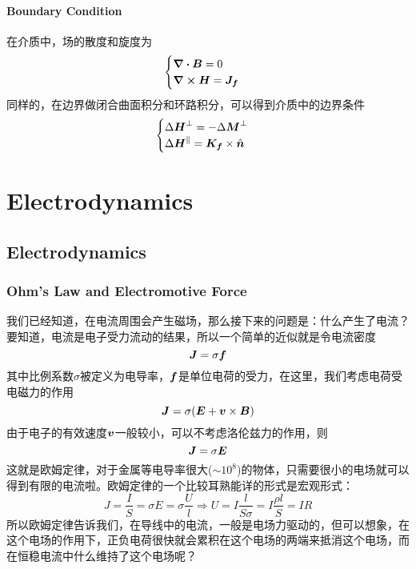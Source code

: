 \documentclass[14pt,oneside]{book}
\begin{document}
\begin{large}
\subsection{Boundary Condition}
在介质中，场的散度和旋度为
\begin{align}
	\begin{cases}
		\div{\vb*{B}}=0\\
		\curl{\vb*{H}}=\vb*{J_f}
	\end{cases}
\end{align}
同样的，在边界做闭合曲面积分和环路积分，可以得到介质中的边界条件
\begin{align}
	\begin{cases}
		\Delta \vb*{H}^\perp =-\Delta \vb*{M}^\perp\\
		\Delta \vb*{H}^\parallel =\vb*{K_f}\times \hat{\vb*{n}}
	\end{cases}
\end{align}

\part{Electrodynamics}
\chapter{Electrodynamics}
\section{Ohm's Law and Electromotive Force}
我们已经知道，在电流周围会产生磁场，那么接下来的问题是：什么产生了电流？要知道，电流是电子受力流动的结果，所以一个简单的近似就是令电流密度
\begin{equation}
  \vb*{J}=\sigma \vb*{f}
\end{equation}
其中比例系数$\sigma$被定义为电导率，$\vb*{f}$是单位电荷的受力，在这里，我们考虑电荷受电磁力的作用
\begin{equation}
  \vb*{J}=\sigma(\vb*{E}+\vb*{v}\times \vb*{B})
\end{equation}
由于电子的有效速度$\vb*{v}$一般较小，可以不考虑洛伦兹力的作用，则
\begin{equation}
  \vb*{J}=\sigma \vb*{E}
\end{equation}
这就是欧姆定律，对于金属等电导率很大($\sim 10^8$)的物体，只需要很小的电场就可以得到有限的电流啦。欧姆定律的一个比较耳熟能详的形式是宏观形式：
\begin{equation}
  J=\frac{I}{S}=\sigma E=\sigma \frac{U}{l}\Rightarrow U=I\frac{l}{S\sigma}=I\frac{\rho l}{S}=IR
\end{equation}
所以欧姆定律告诉我们，在导线中的电流，一般是电场力驱动的，但可以想象，在这个电场的作用下，正负电荷很快就会累积在这个电场的两端来抵消这个电场，而在恒稳电流中什么维持了这个电场呢？


\end{large}
\end{document}
